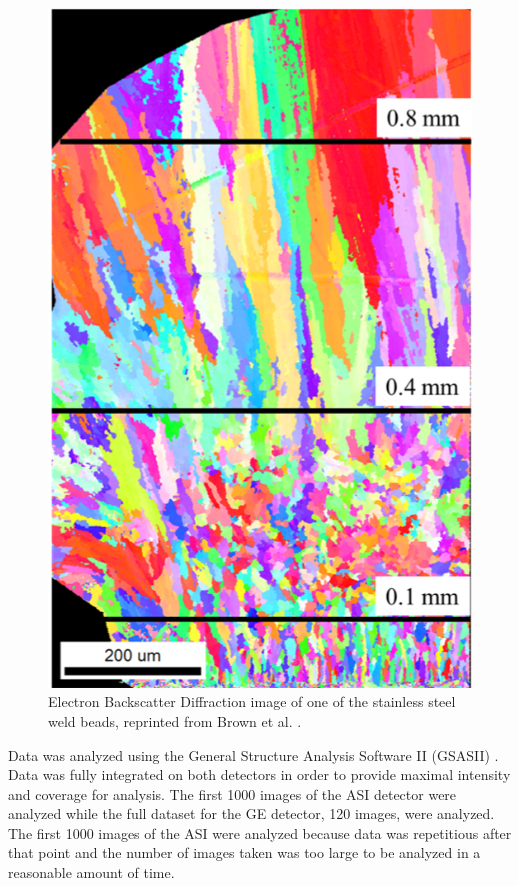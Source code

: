 \documentclass[twocolumn,nofootinbib,notitlepage,aps]{revtex4-1}
\begin{document}
\begin{figure}
	\includegraphics[width=1\linewidth]{SS_EBSD_weldbead}
	\caption{Electron Backscatter Diffraction image of one of the stainless steel weld beads, reprinted from Brown et al. \cite{Brown2019}.}
	\label{EBSD}
\end{figure}

Data was analyzed using the General Structure Analysis Software II (GSASII) \cite{GSASII}. Data was fully integrated on both detectors in order to provide maximal intensity and coverage for analysis. The first 1000 images of the ASI detector were analyzed while the full dataset for the GE detector, 120 images, were analyzed. The first 1000 images of the ASI were analyzed because data was repetitious after that point and the number of images taken was too large to be analyzed in a reasonable amount of time. 
\end{document}
